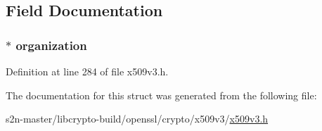 \subsection{Field Documentation}
\subsubsection[{\texorpdfstring{organization}{organization}}]{ $\ast$ organization}\hypertarget{struct_n_o_t_i_c_e_r_e_f__st_a12e16c71ac4aa63829eb2dd1d012fe7a}{}\label{struct_n_o_t_i_c_e_r_e_f__st_a12e16c71ac4aa63829eb2dd1d012fe7a}


Definition at line 284 of file x509v3.\+h.



The documentation for this struct was generated from the following file\+:\begin{DoxyCompactItemize}
\item 
s2n-\/master/libcrypto-\/build/openssl/crypto/x509v3/\hyperlink{crypto_2x509v3_2x509v3_8h}{x509v3.\+h}\end{DoxyCompactItemize}

